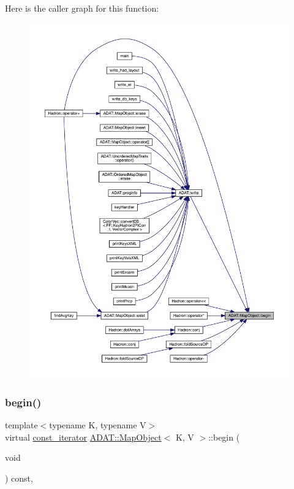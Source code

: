 Here is the caller graph for this function\+:\nopagebreak
\begin{figure}[H]
\begin{center}
\leavevmode
\includegraphics[width=350pt]{da/d29/classADAT_1_1MapObject_a7f4f6830f0efcc2fcd7bb2aebe0b0c95_icgraph}
\end{center}
\end{figure}
\mbox{\label{classADAT_1_1MapObject_a7f4f6830f0efcc2fcd7bb2aebe0b0c95}} 
\subsubsection{\texorpdfstring{begin()}{begin()}\hspace{0.1cm}{\footnotesize\ttfamily [2/2]}}
{\footnotesize\ttfamily template$<$typename K, typename V$>$ \\
virtual \mbox{\hyperlink{classADAT_1_1MapObject_a4622cd7d3b6fed18fe226d28091cc6c8}{const\+\_\+iterator}} \mbox{\hyperlink{classADAT_1_1MapObject}{A\+D\+A\+T\+::\+Map\+Object}}$<$ K, V $>$\+::begin (\begin{DoxyParamCaption}\item[{void}]{ }\end{DoxyParamCaption}) const\hspace{0.3cm}{\ttfamily [inline]}, {\ttfamily [virtual]}}



